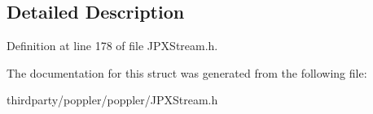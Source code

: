 \subsection{Detailed Description}


Definition at line 178 of file J\+P\+X\+Stream.\+h.



The documentation for this struct was generated from the following file\+:\begin{DoxyCompactItemize}
\item 
thirdparty/poppler/poppler/J\+P\+X\+Stream.\+h\end{DoxyCompactItemize}
